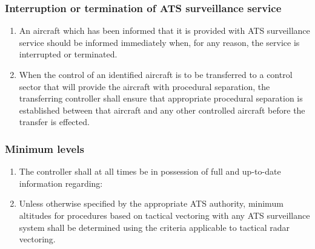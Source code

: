 \subsubsection{Interruption or termination of ATS surveillance service}

\begin{enumerate}
    \item An aircraft which has been informed that it is provided with ATS surveillance service should be informed immediately when, for any reason, the service is interrupted or terminated.
    \item When the control of an identified aircraft is to be transferred to a control sector that will provide the aircraft with procedural separation, the transferring controller shall ensure that appropriate procedural separation is established between that aircraft and any other controlled aircraft before the transfer is effected.
\end{enumerate}

\subsubsection{Minimum levels}

\begin{enumerate}
    \item The controller shall at all times be in possession of full and up-to-date information regarding:
    

    \item \label{8.6.8.2} Unless otherwise specified by the appropriate ATS authority, minimum altitudes for procedures based on tactical vectoring with any ATS surveillance system shall be determined using the criteria applicable to tactical radar vectoring.
\end{enumerate}

